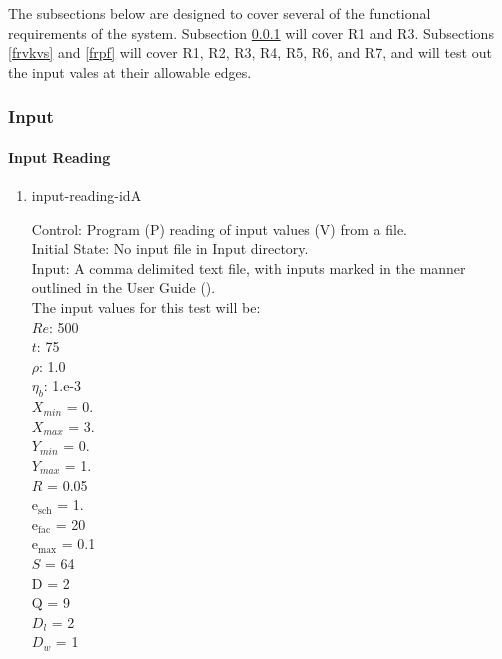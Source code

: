 \documentclass[12pt, titlepage]{article}
\newcounter{testcounter} %
\begin{document}
\label{testfr}

The subsections below are designed to cover several of the functional requirements of the system. Subsection \ref{frinput} will cover R1 and R3. Subsections \ref{frvkvs} and \ref{frpf} will cover R1, R2, R3, R4, R5, R6, and R7, and will test out the input vales at their allowable edges.

\subsubsection{Input}
\label{frinput}
		
\paragraph{Input Reading}

\begin{enumerate}

\item{input-reading-id\thetestcounter A \label{inputreadingtest}\\}

Control: Program (P) reading of input values (V) from a file.\\
				
Initial State: No input file in Input directory.\\
					
Input: A comma delimited text file, with inputs marked in the manner outlined in the User Guide (\citet{LBM_UserGuide_PM}).\\The input values for this test will be:\\$Re$: 500\\
$t$: 75\\
$\rho$: 1.0\\
$\eta_b$: 1.e-3\\
$X_{min}$ = 0.\\
$X_{max}$ = 3.\\
$Y_{min}$ = 0.\\
$Y_{max}$ = 1.\\
$R$ = 0.05\\
$\mathrm{e_{sch}}$ = 1.\\
$\mathrm{e_{fac}}$ = 20\\
$\mathrm{e_{max}}$ = 0.1\\
$S$ = 64\\
$\mathrm{D}$ = 2\\
$\mathrm{Q}$ = 9\\
$D_{l}$ = 2\\
$D_{w}$ = 1\\


\end{enumerate}
\end{document}
